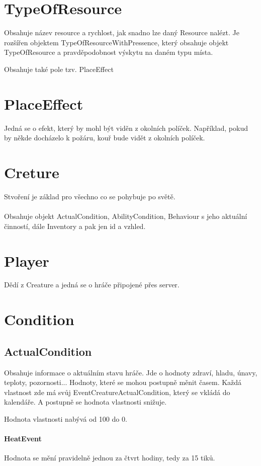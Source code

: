 \documentclass[12pt,a4paper]{report}
\begin{document}
\section{TypeOfResource}
Obsahuje název resource a rychlost, jak snadno lze daný Resource nalézt. Je rozšířen objektem TypeOfResourceWithPressence, který obsahuje objekt TypeOfResource a pravděpodobnost výskytu na daném typu místa.

Obsahuje také pole tzv. PlaceEffect

\section{PlaceEffect}
Jedná se o efekt, který by mohl být viděn z okolních políček. Například, pokud by někde docházelo k požáru, kouř bude vidět z okolních políček.

\section{Creture}
Stvoření je základ pro všechno co se pohybuje po světě.  

\paragraph{}
Obsahuje objekt ActualCondition, AbilityCondition, Behaviour s jeho aktuální činností, dále Inventory a pak jen id a vzhled.

\section{Player}
Dědí z Creature a jedná se o hráče připojené přes server.
\section{Condition} 
\subsection{ActualCondition}
Obsahuje informace o aktuálním stavu hráče. Jde o hodnoty zdraví, hladu, únavy, teploty, pozornosti... Hodnoty, které se mohou postupně měnit časem. Každá vlastnost zde má svůj EventCreatureActualCondition, který se vkládá do kalendáře. A postupně se hodnota vlastnosti snižuje. 

Hodnota vlastnosti nabývá od 100 do 0.

\paragraph{HeatEvent}
Hodnota se mění pravidelně jednou za čtvrt hodiny, tedy za 15 tiků.
\end{document}
